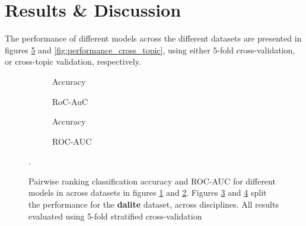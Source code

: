 \documentclass[runningheads]{llncs}
\begin{document}
\section{Results \& Discussion}

The performance of different models across the different datasets are presented 
in figures \ref{fig:performance_k_fold} and \ref{fig:performance_cross_topic}, 
using either 5-fold cross-validation, or cross-topic validation, respectively. 

\begin{figure}
	\begin{subfigure}[t]{0.5\linewidth}
		\centering
		\scalebox{0.5}{}
		\caption{Accuracy}
		\label{fig:acc_kfold}
	\end{subfigure}%
	\qquad
	\begin{subfigure}[t]{0.5\linewidth}
		\centering
		\scalebox{0.5}{}
		\caption{RoC-AuC}
		\label{fig:AUC_kfold}
	\end{subfigure}
	
	\begin{subfigure}[t]{0.5\linewidth}
		\centering
		\scalebox{0.5}{}
		\caption{Accuracy}
		\label{fig:acc_dalite_kfold}
	\end{subfigure}%
	\qquad
	\begin{subfigure}[t]{0.5\linewidth}
		\centering
		\scalebox{0.5}{}
		\caption{ROC-AUC}
		\label{fig:AUC_dalite_kfold}
	\end{subfigure}	
	\caption{Pairwise ranking classification accuracy and ROC-AUC for 
		different models in across datasets in figures \ref{fig:acc_kfold} and 
		\ref{fig:AUC_kfold}. Figures \ref{fig:acc_dalite_kfold} and 
		\ref{fig:AUC_dalite_kfold} split the performance for the 
		\textbf{dalite} 
		dataset, across disciplines. All results evaluated using 5-fold 
		stratified 
		cross-validation}.
	\label{fig:performance_k_fold}
\end{figure}
\end{document}
